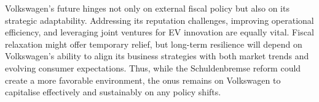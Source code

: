 \documentclass[10pt]{article}
\begin{document}
Volkswagen's future hinges not only on external fiscal policy but also on its strategic adaptability. Addressing its reputation challenges, improving operational efficiency, and leveraging joint ventures for EV innovation are equally vital. Fiscal relaxation might offer temporary relief, but long-term resilience will depend on Volkswagen's ability to align its business strategies with both market trends and evolving consumer expectations. Thus, while the Schuldenbremse reform could create a more favorable environment, the onus remains on Volkswagen to capitalise effectively and sustainably on any policy shifts.

\newpage
\printbibliography
\end{document}
